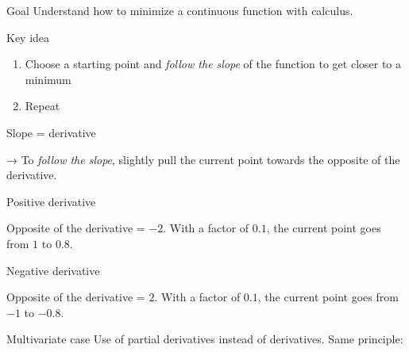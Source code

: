 
\begin{frame}{Goal}
  Understand how to minimize a continuous function with calculus.
\end{frame}

\begin{frame}{Key idea}

  \begin{enumerate}
    \item Choose a starting point and \emph{follow the slope} of the function to get closer to a minimum
    \item Repeat
  \end{enumerate}

  Slope = derivative

  → To \emph{follow the slope}, slightly pull the current point towards the opposite of the derivative.
\end{frame}

\begin{frame}{Positive derivative}


  Opposite of the derivative = $-2$. With a factor of $0.1$, the current point goes from $1$ to $0.8$.
\end{frame}

\begin{frame}{Negative derivative}


  Opposite of the derivative = $2$. With a factor of $0.1$, the current point goes from $-1$ to $-0.8$.
\end{frame}

\begin{frame}{Multivariate case}
  Use of partial derivatives instead of derivatives. Same principle:
\end{frame}
